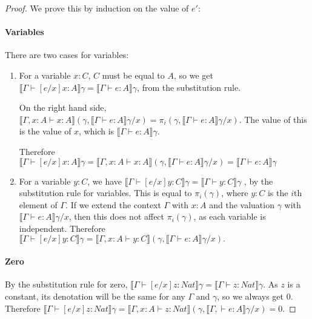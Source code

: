 \begin{proof}

We prove this by induction on the value of $e'$:

\paragraph{Variables} There are two cases for variables:
\begin{enumerate}
\item{For a variable $x : C$, $C$ must be equal to $A$, so we get $\llbracket \Gamma \vdash [e/x]x : A \rrbracket \gamma = \llbracket \Gamma \vdash e : A \rrbracket \gamma$, from the substitution rule. 

On the right hand side, $\llbracket \Gamma , x : A \vdash x : A \rrbracket(\gamma , \llbracket \Gamma \vdash e : A \rrbracket \gamma/x) = \pi_i(\gamma , \llbracket \Gamma \vdash e : A \rrbracket \gamma / x)$. The value of this is the value of $x$, which is $\llbracket \Gamma \vdash e : A \rrbracket \gamma$.

Therefore $\llbracket \Gamma \vdash [e/x]x : A \rrbracket \gamma = \llbracket \Gamma , x : A \vdash x : A \rrbracket(\gamma , \llbracket \Gamma \vdash e : A \rrbracket \gamma/x) = \llbracket \Gamma \vdash e : A \rrbracket \gamma$ }
\item{For a variable $y: C$, we have $\llbracket \Gamma \vdash [e/x]y : C \rrbracket \gamma = \llbracket \Gamma \vdash y : C \rrbracket \gamma$ , by the substitution rule for variables. This is equal to $\pi_i(\gamma)$, where $y : C$ is the $i$th element of $\Gamma$. If we extend the context $\Gamma$ with $x:A$ and the valuation $\gamma$ with $\llbracket \Gamma \vdash e : A \rrbracket \gamma / x$, then this does not affect $\pi_i(\gamma)$, as each variable is independent. Therefore $\llbracket \Gamma \vdash [e/x]y : C \rrbracket \gamma =\llbracket \Gamma, x : A \vdash y: C \rrbracket (\gamma, \llbracket \Gamma \vdash e : A \rrbracket \gamma / x).$}
\end{enumerate}

\paragraph{Zero} By the substitution rule for zero, $\llbracket \Gamma \vdash [e/x]z : Nat \rrbracket \gamma = \llbracket \Gamma \vdash z : Nat \rrbracket \gamma$. As $z$ is a constant, its denotation will be the same for any $\Gamma$ and $\gamma$, so we always get 0. Therefore $\llbracket \Gamma \vdash [e/x]z : Nat \rrbracket \gamma = \llbracket \Gamma, x : A \vdash z : Nat \rrbracket (\gamma, \llbracket \Gamma , \vdash e : A \rrbracket \gamma / x) = 0.$


\end{proof}
